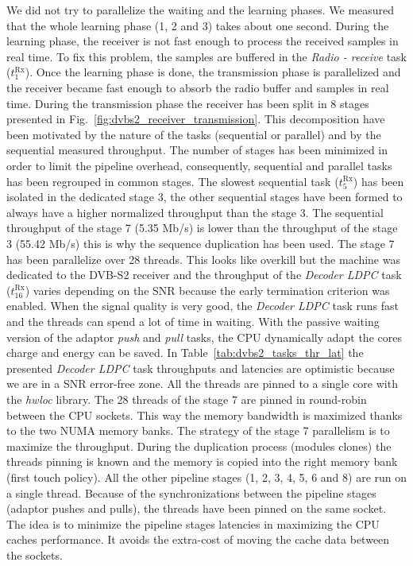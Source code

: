We did not try to parallelize the waiting and the learning phases. We measured
that the whole learning phase (1, 2 and 3) takes about one second. During the
learning phase, the receiver is not fast enough to process the received samples
in real time. To fix this problem, the samples are buffered in the \emph{Radio -
receive} task ($t^\text{Rx}_{1}$). Once the learning phase is done, the
transmission phase is parallelized and the receiver became fast enough to absorb
the radio buffer and samples in real time. During the transmission phase the
receiver has been split in 8 stages presented in
Fig.~\ref{fig:dvbs2_receiver_transmission}. This decomposition have been
motivated by the nature of the tasks (sequential or parallel) and by the
sequential measured throughput. The number of stages has been minimized in order
to limit the pipeline overhead, consequently, sequential and parallel tasks
has been regrouped in common stages. The slowest sequential task
($t^\text{Rx}_{5}$) has been isolated in the dedicated stage 3, the other
sequential stages have been formed to always have a higher normalized throughput
than the stage 3. The sequential throughput of the stage 7 (5.35 Mb/s) is lower
than the throughput of the stage 3 (55.42 Mb/s) this is why the sequence
duplication has been used. The stage 7 has been parallelize over 28 threads.
This looks like overkill but the machine was dedicated to the DVB-S2 receiver
and the throughput of the \emph{Decoder LDPC} task ($t^\text{Rx}_{16}$) varies
depending on the SNR because the early termination criterion was enabled.
When the signal quality is very good, the \emph{Decoder LDPC} task runs fast
and the threads can spend a lot of time in waiting. With the passive waiting
version of the adaptor \emph{push} and \emph{pull} tasks, the CPU dynamically
adapt the cores charge and energy can be saved. In
Table~\ref{tab:dvbs2_tasks_thr_lat} the presented \emph{Decoder LDPC} task
throughputs and latencies are optimistic because we are in a SNR error-free
zone. All the threads are pinned to a single core with the \emph{hwloc} library.
The 28 threads of the stage 7 are pinned in round-robin between the CPU sockets.
This way the memory bandwidth is maximized thanks to the two NUMA memory banks.
The strategy of the stage 7 parallelism is to maximize the throughput. During
the duplication process (modules clones) the threads pinning is known and the
memory is copied into the right memory bank (first touch policy). All the other
pipeline stages (1, 2, 3, 4, 5, 6 and 8) are run on a single thread. Because of
the synchronizations between the pipeline stages (adaptor pushes and pulls), the
threads have been pinned on the same socket. The idea is to minimize the
pipeline stages latencies in maximizing the CPU caches performance. It avoids
the extra-cost of moving the cache data between the sockets.

